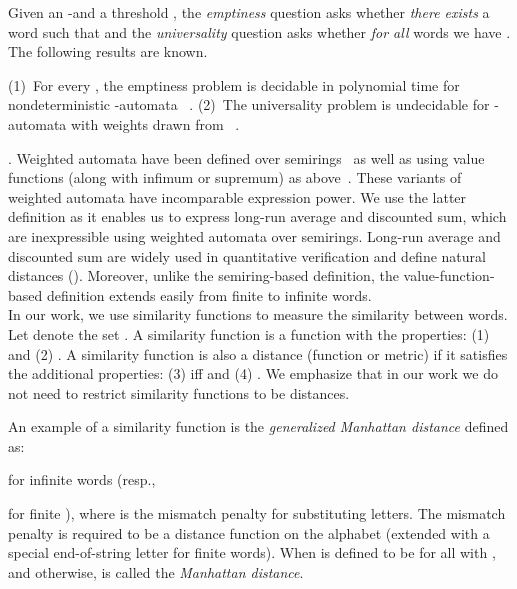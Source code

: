 Given an -\wa  and a threshold , the \emph{emptiness} question
asks whether {\em there exists} a word  such that   and the \emph{universality} question asks whether {\em for all} words
 we have .  The following results are known.

\begin{lemma}
(1)~For every ,
the emptiness problem is decidable 
in polynomial time for nondeterministic -automata
~\cite{Filar:1996:CMD:248676,Droste:2009:HWA:1667106}.
(2)~The universality problem is undecidable for -automata with 
weights drawn from ~\cite{DBLP:journals/ijac/Krob94,DBLP:conf/atva/AlmagorBK11}.
\label{lem:oldResults}
\end{lemma}



.
Weighted automata have been defined over semirings~\cite{Droste:2009:HWA:1667106} as
well as using value functions (along with infimum or supremum) as above~\cite{DBLP:conf/fct/ChatterjeeDH09,DBLP:journals/tocl/ChatterjeeDH10}.                 
These variants of weighted automata have incomparable expression power.
We use the latter definition as it enables us to express long-run average and discounted sum,
which are inexpressible using weighted automata over semirings.
Long-run average and discounted sum are
widely used in quantitative verification and define natural distances ().
Moreover, unlike the semiring-based definition, the value-function-based definition 
extends easily from finite to infinite words.\\


 In our work, we use similarity functions
to measure the similarity between words. Let  denote the set . 
A similarity function  is a function with the properties:  (1)  and (2)
 . A similarity function  is also a
distance (function or metric) if it satisfies the additional
properties:  (3)  iff  and (4)  . We emphasize that in our work we do not need to restrict similarity functions to be distances.  

An example of a similarity function
is the \emph{generalized Manhattan distance} defined as: 
 
for infinite words  (resp.,  
 
for finite ), where 
 is the mismatch penalty for substituting letters.
The mismatch penalty is required to be a distance function 
on the alphabet (extended with a special end-of-string letter  for finite words). When  is defined to be  for all  with , and  otherwise, 
 is called the \emph{Manhattan distance}. 
 
